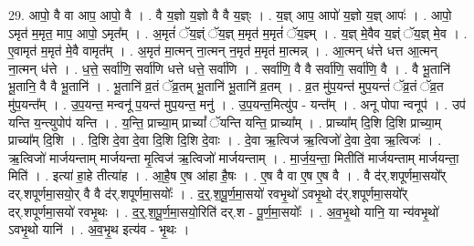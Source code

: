 \documentclass[17pt]{extarticle}
\begin{document}
29. आपो॒ वै वा आप॒ आपो॒ वै । . वै य॒ज्ञो य॒ज्ञो वै वै य॒ज्ञ्ः । . य॒ज्ञ् आप॒ आपो॑ य॒ज्ञो य॒ज्ञ् आपः॑ । . आपो॒ ऽमृत॑ म॒मृत॒ माप॒ आपो॒ ऽमृत᳚म् । . अ॒मृतं॑ ॅय॒ज्ञ्ं ॅय॒ज्ञ् म॒मृत॑ म॒मृतं॑ ॅय॒ज्ञ्म् । . य॒ज्ञ् मे॒वैव य॒ज्ञ्ं ॅय॒ज्ञ् मे॒व । . ए॒वामृत॑ म॒मृत॑ मे॒वै वामृत᳚म् । . अ॒मृत॑ मा॒त्मन् ना॒त्मन् न॒मृत॑ म॒मृत॑ मा॒त्मन्न् । . आ॒त्मन् ध॑त्ते धत्त आ॒त्मन् ना॒त्मन् ध॑त्ते । . ध॒त्ते॒ सर्वा॑णि॒ सर्वा॑णि धत्ते धत्ते॒ सर्वा॑णि । . सर्वा॑णि॒ वै वै सर्वा॑णि॒ सर्वा॑णि॒ वै । . वै भू॒तानि॑ भू॒तानि॒ वै वै भू॒तानि॑ । . भू॒तानि॑ व्र॒तं ॅव्र॒तम् भू॒तानि॑ भू॒तानि॑ व्र॒तम् । . व्र॒त मु॑प॒यन्त॑ मुप॒यन्तं॑ ॅव्र॒तं ॅव्र॒त मु॑प॒यन्त᳚म् । . उ॒प॒यन्त॒ मन्वनू॑ प॒यन्त॑ मुप॒यन्त॒ मनु॑ । . उ॒प॒यन्त॒मित्यु॑प - यन्त᳚म् । . अनू पोपा न्वनूप॑ । . उप॑ यन्ति य॒न्त्युपोप॑ यन्ति । . य॒न्ति॒ प्राच्या॒म् प्राच्यां᳚ ॅयन्ति यन्ति॒ प्राच्या᳚म् । . प्राच्या᳚म् दि॒शि दि॒शि प्राच्या॒म् प्राच्या᳚म् दि॒शि । . दि॒शि दे॒वा दे॒वा दि॒शि दि॒शि दे॒वाः । . दे॒वा ऋ॒त्विज॑ ऋ॒त्विजो॑ दे॒वा दे॒वा ऋ॒त्विजः॑ । . ऋ॒त्विजो॑ मार्जयन्ताम् मार्जयन्ता मृ॒त्विज॑ ऋ॒त्विजो॑ मार्जयन्ताम् । . मा॒र्ज॒य॒न्ता॒ मितीति॑ मार्जयन्ताम् मार्जयन्ता॒ मिति॑ । . इत्या॑ हा॒हे तीत्या॑ह । . आ॒है॒ष ए॒ष आ॑हा है॒षः । . ए॒ष वै वा ए॒ष ए॒ष वै । . वै द॑र्.शपूर्णमा॒सयो᳚र् दर्.शपूर्णमा॒सयो॒र् वै वै द॑र्.शपूर्णमा॒सयोः᳚ । . द॒र्॒.श॒पू॒र्ण॒मा॒सयो॑ रवभृ॒थो॑ ऽवभृ॒थो द॑र्.शपूर्णमा॒सयो᳚र् दर्.शपूर्णमा॒सयो॑ रवभृ॒थः । . द॒र्॒.श॒पू॒र्ण॒मा॒सयो॒रिति॑ दर्.श - पू॒र्ण॒मा॒सयोः᳚ । . अ॒व॒भृ॒थो यानि॒ या न्य॑वभृ॒थो॑ ऽवभृ॒थो यानि॑ । . अ॒व॒भृ॒थ इत्य॑व - भृ॒थः । \newline
\end{document}
